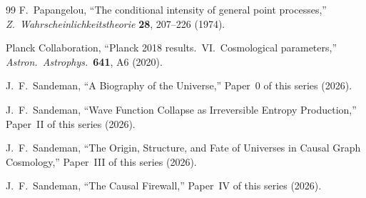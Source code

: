 \documentclass[12pt,a4paper]{article}
\begin{document}
\begin{thebibliography}{99}
 F.~Papangelou, ``The conditional intensity of general point processes,'' \emph{Z.\ Wahrscheinlichkeitstheorie} \textbf{28}, 207--226 (1974).

 Planck Collaboration, ``Planck 2018 results.\ VI.\ Cosmological parameters,'' \emph{Astron.\ Astrophys.}\ \textbf{641}, A6 (2020).

 J.~F.~Sandeman, ``A Biography of the Universe,'' Paper~0 of this series (2026).

 J.~F.~Sandeman, ``Wave Function Collapse as Irreversible Entropy Production,'' Paper~II of this series (2026).

 J.~F.~Sandeman, ``The Origin, Structure, and Fate of Universes in Causal Graph Cosmology,'' Paper~III of this series (2026).

 J.~F.~Sandeman, ``The Causal Firewall,'' Paper~IV of this series (2026).

\end{thebibliography}
\end{document}

